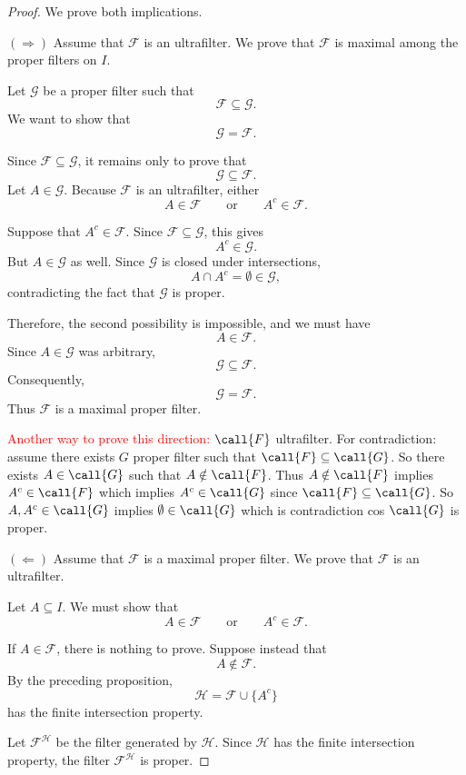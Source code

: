 {\begin{proof}
We prove both implications.

\noindent\((\Rightarrow)\)
Assume that \(\mathcal{F}\) is an ultrafilter. We prove that
\(\mathcal{F}\) is maximal among the proper filters on \(I\).

Let \(\mathcal{G}\) be a proper filter such that
\[
\mathcal{F}\subseteq\mathcal{G}.
\]
We want to show that
\[
\mathcal{G}=\mathcal{F}.
\]

Since \(\mathcal{F}\subseteq\mathcal{G}\), it remains only to prove that
\[
\mathcal{G}\subseteq\mathcal{F}.
\]
Let \(A\in\mathcal{G}\). Because \(\mathcal{F}\) is an ultrafilter, either
\[
A\in\mathcal{F}
\qquad\text{or}\qquad
A^c\in\mathcal{F}.
\]

Suppose that \(A^c\in\mathcal{F}\). Since
\(\mathcal{F}\subseteq\mathcal{G}\), this gives
\[
A^c\in\mathcal{G}.
\]
But \(A\in\mathcal{G}\) as well. Since \(\mathcal{G}\) is closed under
intersections,
\[
A\cap A^c=\emptyset\in\mathcal{G},
\]
contradicting the fact that \(\mathcal{G}\) is proper.

Therefore, the second possibility is impossible, and we must have
\[
A\in\mathcal{F}.
\]
Since \(A\in\mathcal{G}\) was arbitrary,
\[
\mathcal{G}\subseteq\mathcal{F}.
\]
Consequently,
\[
\mathcal{G}=\mathcal{F}.
\]
Thus \(\mathcal{F}\) is a maximal proper filter.

\textcolor{red}{Another way to prove this direction:}
$\call{F}$ ultrafilter. For contradiction: assume there exists $G$ proper filter such that $\call{F} \subseteq \call{G}$. So there exists $A \in \call{G}$ such that $A \notin \call{F}$. Thus $A \notin \call{F}$ implies $A^c \in \call{F}$ which implies $A^c \in \call{G}$ since $\call{F} \subseteq \call{G}$. So $A, A^c \in \call{G}$ implies $\emptyset \in \call{G}$ which is contradiction cos $\call{G}$ is proper.

\noindent\((\Leftarrow)\)
Assume that \(\mathcal{F}\) is a maximal proper filter. We prove that
\(\mathcal{F}\) is an ultrafilter.

Let \(A\subseteq I\). We must show that
\[
A\in\mathcal{F}
\qquad\text{or}\qquad
A^c\in\mathcal{F}.
\]

If \(A\in\mathcal{F}\), there is nothing to prove. Suppose instead that
\[
A\notin\mathcal{F}.
\]
By the preceding proposition,
\[
\mathcal{H}
=
\mathcal{F}\cup\{A^c\}
\]
has the finite intersection property.

Let \(\mathcal{F}^{\mathcal{H}}\) be the filter generated by
\(\mathcal{H}\). Since \(\mathcal{H}\) has the finite intersection
property, the filter \(\mathcal{F}^{\mathcal{H}}\) is proper.


\end{proof}}
